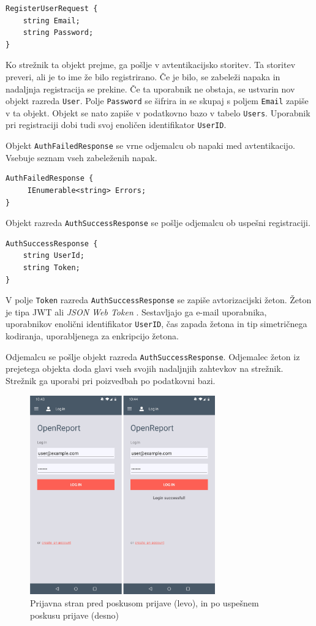 \documentclass[a4paper, 12pt]{book}
\begin{document}
\begin{verbatim}
RegisterUserRequest {
    string Email; 
    string Password; 
} 
\end{verbatim}


Ko strežnik ta objekt prejme, ga pošlje v avtentikacijsko storitev.
Ta storitev preveri, ali je to ime že bilo registrirano.
Če je bilo, se zabeleži napaka in nadaljnja registracija se prekine.
Če ta uporabnik ne obstaja, se ustvarin nov objekt razreda \texttt{User}.
Polje \texttt{Password} se šifrira in se skupaj s poljem \texttt{Email} zapiše v ta objekt.
Objekt se nato zapiše v podatkovno bazo v tabelo \texttt{Users}.
Uporabnik pri registraciji dobi tudi svoj enoličen identifikator \texttt{UserID}.

Objekt \texttt{AuthFailedResponse} se vrne odjemalcu ob napaki med avtentikacijo.
Vsebuje seznam vseh zabeleženih napak.

\begin{verbatim}
AuthFailedResponse { 
     IEnumerable<string> Errors; 
}
\end{verbatim}

Objekt razreda \texttt{AuthSuccessResponse} se pošlje odjemalcu ob uspešni registraciji.

\begin{verbatim}
AuthSuccessResponse { 
    string UserId; 
    string Token; 
} 
\end{verbatim}


\noindent V polje \texttt{Token} razreda \texttt{AuthSuccessResponse} se zapiše avtorizacijski žeton.
Žeton je tipa JWT ali \textit{JSON Web Token} \cite{jwtinfo}.
Sestavljajo ga e-mail uporabnika, uporabnikov enolični identifikator \texttt{UserID}, čas zapada žetona in tip simetričnega kodiranja, uporabljenega za enkripcijo žetona.

Odjemalcu se pošlje objekt razreda \texttt{AuthSuccessResponse}.
Odjemalec žeton iz prejetega objekta doda glavi vseh svojih nadaljnjih zahtevkov na strežnik.
Strežnik ga uporabi pri poizvedbah po podatkovni bazi.

\begin{figure}[H]
\begin{center}
\includegraphics[width=8cm]{app_login}
\end{center}
	\caption{Prijavna stran pred poskusom prijave (levo), in po uspešnem poskusu prijave (desno)}
\label{app_login}
\end{figure}
\end{document}
